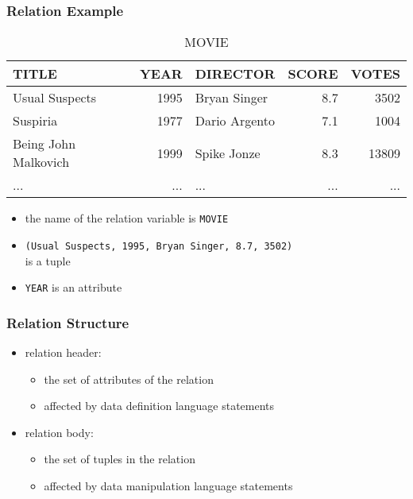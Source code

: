 \documentclass[dvipsnames]{beamer}
\theoremstyle{plain}
\begin{document}
\begin{frame}
  \frametitle{Relation Example}

  \begin{footnotesize}
  \begin{table}
    \caption{MOVIE}
    \begin{tabular}{|l|r|l|r|r|}\hline
TITLE                & YEAR & DIRECTOR      & SCORE & VOTES\\\hline\hline
Usual Suspects       & 1995 & Bryan Singer  &   8.7 &  3502\\\hline
Suspiria             & 1977 & Dario Argento &   7.1 &  1004\\\hline
Being John Malkovich & 1999 & Spike Jonze   &   8.3 & 13809\\\hline
...                  &  ... & ...           &   ... &   ...\\\hline
    \end{tabular}
  \end{table}
  \end{footnotesize}

  \begin{itemize}
    \item the name of the relation variable is \texttt{MOVIE}
    \item \texttt{(Usual Suspects, 1995, Bryan Singer, 8.7, 3502)}\\
      is a tuple
    \item \texttt{YEAR} is an attribute
  \end{itemize}
\end{frame}

\begin{frame}
  \frametitle{Relation Structure}

    \begin{itemize}
      \item relation header:
      \begin{itemize}
        \item the set of attributes of the relation
        \item affected by data definition language statements
      \end{itemize}

      \pause
      \medskip
      \item relation body:
      \begin{itemize}
        \item the set of tuples in the relation
        \item affected by data manipulation language statements
      \end{itemize}
    \end{itemize}
\end{frame}
\end{document}
